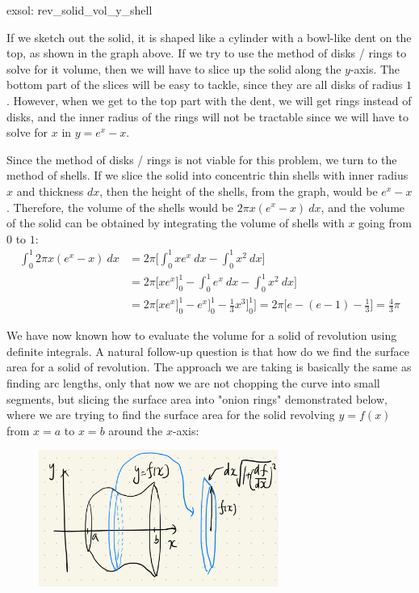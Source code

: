 \begin{egsol}[]{exsol: rev_solid_vol_y_shell}
    \begin{center}
    \end{center}

    \medskip
    If we sketch out the solid, it is shaped like a cylinder with a bowl-like dent on the top, as shown in the graph above.  If we try to use the method of disks / rings to solve for it volume, then we will have to slice up the solid along the $y$-axis.  The bottom part of the slices will be easy to tackle, since they are all disks of radius $1$.  However, when we get to the top part with the dent, we will get rings instead of disks, and the inner radius of the rings will not be tractable since we will have to solve for $x$ in $y = e^x - x$. 
    
    Since the method of disks / rings is not viable for this problem, we turn to the method of shells.  If we slice the solid into concentric thin shells with inner radius $x$ and thickness $dx$, then the height of the shells, from the graph, would be $e^x - x$.  Therefore, the volume of the shells would be $2 \pi x (e^x-x)~dx$, and the volume of the solid can be obtained by integrating the volume of shells with $x$ going from $0$ to $1$:
    \begin{align*}
        \int_0^1 2 \pi x (e^x-x)~dx &= 2\pi\Big[\int_0^1 xe^x~dx - \int_0^1 x^2~dx\Big]\\
        &= 2\pi\Big[xe^x\big]_0^1 - \int_0^1 e^x~dx - \int_0^1 x^2~dx\Big]\\
        &= 2\pi\Big[xe^x\big]_0^1 - e^x\big]_0^1 - \frac{1}{3}x^3\big]_0^1\Big] = 2\pi\Big[e - (e - 1) - \frac{1}{3}\Big] = \frac{4}{3}\pi
    \end{align*}
\end{egsol}

We have now known how to evaluate the volume for a solid of revolution using definite integrals.  A natural follow-up question is that how do we find the surface area for a solid of revolution.  The approach we are taking is basically the same as finding arc lengths, only that now we are not chopping the curve into small segments, but slicing the surface area into "onion rings" demonstrated below, where we are trying to find the surface area for the solid revolving $y = f(x)$ from $x = a$ to $x = b$ around the $x$-axis:

\begin{figure}[ht]
    \centering
    \includegraphics[width = 0.7\textwidth]{figures/chap 07/surface_area.png}
\end{figure}

